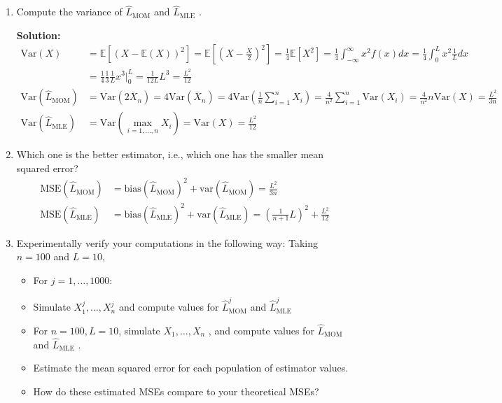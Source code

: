 \documentclass[letter, 12pt]{article}
\begin{document}
\begin{enumerate}[wide = 0pt, label = \arabic*)]
		\item {Compute the variance of $ \hat{L}_{\text{MOM}} $ and $ \hat{L}_{\text{MLE}} $ .}
		\par{\textbf{Solution:}}
		\begin{align*}
			\text{Var}({X}) &= \mathbb{E}[(X - \mathbb{E}(X))^2] = \mathbb{E}[(X - \frac{X}{2})^2] = \frac{1}{4} \mathbb{E}[X^2] = \frac{1}{4} \int_{-\infty}^{\infty} x^2 f(x) dx = \frac{1}{4} \int_{0}^{L} x^2 \frac{1}{L} dx \\
			&= \frac{1}{4} \frac{1}{3} \frac{1}{L} x^3 \Big|_0^L = \frac{1}{12 L} L^3 = \frac{L^2}{12}\\
			\text{Var}(\hat{L}_{\text{MOM}}) &= \text{Var}(2 \overline{X}_n) = 4 \text{Var}(\overline{X}_n) = 4 \text{Var}(\frac{1}{n}\sum_{i=1}^{n} {X}_i) = \frac{4}{n^2} \sum_{i=1}^{n} \text{Var}({X}_i) = \frac{4}{n^2} n \text{Var}({X}) = \frac{L^2}{3 n} \\
			\text{Var}(\hat{L}_{\text{MLE}}) &= \text{Var}(\max_{i=1,\dots,n} X_i) = \text{Var}({X}) = \frac{L^2}{12}
		\end{align*}
		
		\item {Which one is the better estimator, i.e., which one has the smaller mean squared error?}
		\begin{align*}
			\text{MSE}(\hat{L}_{\text{MOM}}) &= \text{bias}(\hat{L}_{\text{MOM}})^2 + \text{var}(\hat{L}_{\text{MOM}}) = \frac{L^2}{3 n} \\
			\text{MSE}(\hat{L}_{\text{MLE}}) &= \text{bias}(\hat{L}_{\text{MLE}})^2 + \text{var}(\hat{L}_{\text{MLE}}) = (\frac{1}{n+1} L)^2 + \frac{L^2}{12}
		\end{align*}
		
		\item {Experimentally verify your computations in the following way: Taking $ n = 100 $ and $ L = 10 $,}
		\begin{itemize}
			\item {For $ j = 1, \dots , 1000 $:}
			\item {Simulate $ X_1^j , \dots , X_n^j $ and compute values for $ \hat{L}_{\text{MOM}}^j $ and $ \hat{L}_{\text{MLE}}^j $}
			\item {For $ n = 100, L = 10 $, simulate $ X_1 , \dots , X_n $ , and compute values for $ \hat{L}_{\text{MOM}} $ and $ \hat{L}_{\text{MLE}} $ .}
			\item {Estimate the mean squared error for each population of estimator values.}
			\item {How do these estimated MSEs compare to your theoretical MSEs?}
		\end{itemize}
	

\end{enumerate}
\end{document}
